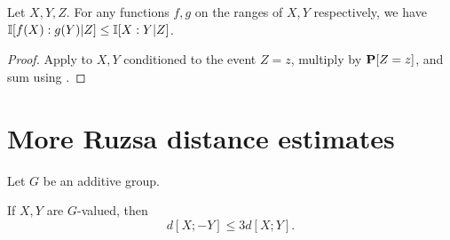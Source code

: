 \begin{lemma}\label{data-process}\leanok Let $X,Y,Z$. For any functions $f, g$
on the ranges of $X, Y$ respectively, we have $\mathbb{I}[f(X) : g(Y )|Z] \leq \mathbb{I}[X :Y |Z]$.
\end{lemma}

\begin{proof}\leanok  Apply  to $X,Y$ conditioned to the event $Z=z$, multiply by ${\bf P}[Z=z]$, and sum using .
\end{proof}

\section{More Ruzsa distance estimates}

Let $G$ be an additive group.

\begin{lemma}\label{sign-flip}\leanok
  If $X,Y$ are $G$-valued, then
  $$  d[X ; -Y]  \leq 3 d[X;Y].$$
\end{lemma}

